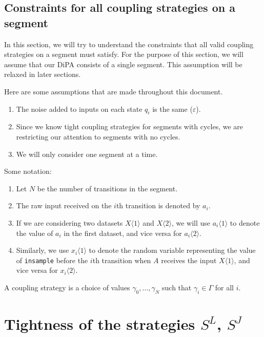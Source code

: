 \documentclass{article}
\renewcommand{\epsilon}{\varepsilon}
\begin{document}
\newpage

\subsection{Constraints for all coupling strategies on a segment}

In this section, we will try to understand the constraints that all valid coupling strategies on a segment must satisfy. For the purpose of this section, we will assume that our DiPA consists of a single segment. This assumption will be relaxed in later sections. 

Here are some assumptions that are made throughout this document.

\begin{enumerate}
    \item The noise added to inputs on each state $q_i$ is the same ($\epsilon$).
    \item  Since we know tight coupling strategies for segments with cycles, we are restricting our attention to segments with no cycles.
    \item We will only consider one segment at a time.
\end{enumerate}

Some notation:

\begin{enumerate}
    \item Let $N$ be the number of transitions in the segment.
    \item The raw input received on the $i$th transition is denoted by $a_i$.

    \item If we are considering two datasets $X\langle 1 \rangle$ and $X \langle 2 \rangle$, we will use $a_i \langle 1 \rangle$ to denote the value of $a_i$ in the first dataset, and vice versa for $a_i \langle 2 \rangle$.
    
    \item Similarly, we use $x_i \langle 1 \rangle$ to denote the random variable representing the value of \texttt{insample} before the $i$th transition when $A$ receives the input $X\langle 1 \rangle$, and vice versa for $x_i \langle 2 \rangle$.
\end{enumerate}

A coupling strategy is a choice of values $\gamma_0, \dots, \gamma_N$ such that $\gamma_i \in \Gamma$ for all $i$. 

\section{Tightness of the strategies $S^L$, $S^J$}
\end{document}
